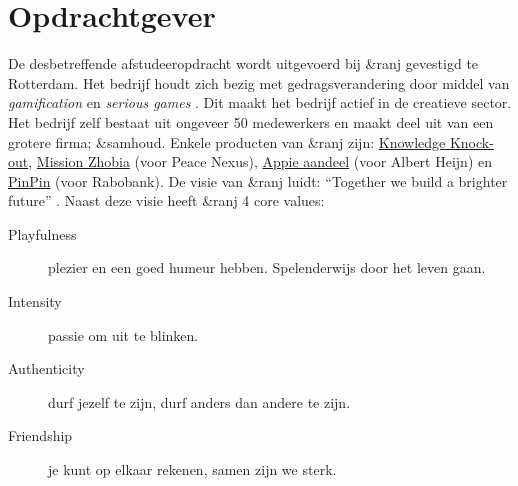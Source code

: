 \documentclass{report}
\newcommand{\organisation}{\&ranj }
\begin{document}
\section{Opdrachtgever}
De desbetreffende afstudeeropdracht wordt uitgevoerd bij \organisation gevestigd te Rotterdam. Het bedrijf houdt zich bezig met gedragsverandering door middel van \emph{gamification} en \emph{serious games} \cite{websiteranj}. Dit maakt het bedrijf actief in de creatieve sector.
Het bedrijf zelf bestaat uit ongeveer 50 medewerkers \cite{linkedinranj} en maakt deel uit van een grotere firma; \&samhoud. Enkele producten van \organisation zijn: \href{https://ranj.com/products#knowledge-knock-out}{Knowledge Knock-out}, \href{https://ranj.com/projects/corporate/development#mission-zhobia}{Mission Zhobia} (voor Peace Nexus), \href{https://ranj.com/projects/corporate/development#appie-aandeel}{Appie aandeel} (voor Albert Heijn) en \href{https://ranj.com/projects/education#pinpin}{PinPin} (voor Rabobank).
De visie van \organisation luidt: ``Together we build a brighter future'' \cite{websiteranj}.
Naast deze visie heeft \organisation 4 core values:
\begin{description}
\item[Playfulness] plezier en een goed humeur hebben. Spelenderwijs door het leven gaan.
\item[Intensity] passie om uit te blinken.
\item[Authenticity] durf jezelf te zijn, durf anders dan andere te zijn.
\item[Friendship] je kunt op elkaar rekenen, samen zijn we sterk.
\end{description}
\end{document}
